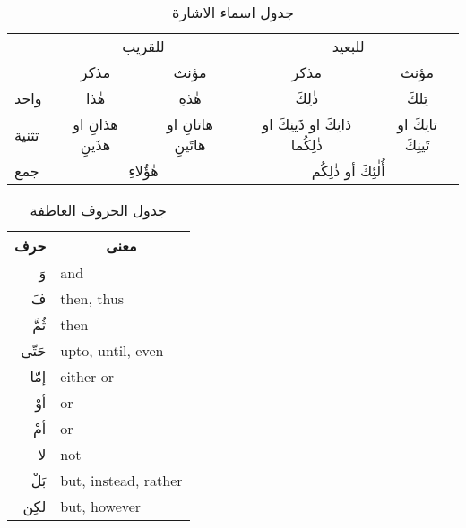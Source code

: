 \documentclass[../main.tex]{subfiles}
\begin{document}
\begin{table}[H]
\centering
\begin{tabular}{lcccc}
                           & \multicolumn{2}{c}{للقريب}                                                    & \multicolumn{2}{c}{للبعيد}                                                                  \\
                           & مذكر                                 & مؤنث                                   & مذكر                                               & مؤنث                                   \\ \cline{2-5} 
\multicolumn{1}{l|}{واحد}  & \multicolumn{1}{c|}{هٰذا}            & \multicolumn{1}{c|}{هٰذهِ}             & \multicolumn{1}{c|}{ذٰلِكَ}                        & \multicolumn{1}{c|}{تِلكَ}             \\ \cline{2-5} 
\multicolumn{1}{l|}{تثنية} & \multicolumn{1}{c|}{هذانِ او هذَينِ} & \multicolumn{1}{c|}{هاتانِ او هاتَينِ} & \multicolumn{1}{c|}{ذانِكَ او ذَينِكَ او ذٰلِكُما} & \multicolumn{1}{c|}{تانِكَ او تَينِكَ} \\ \cline{2-5} 
\multicolumn{1}{l|}{جمع}   & \multicolumn{2}{c|}{هٰؤُلاءِ}                                                 & \multicolumn{2}{c|}{أُلٰئِكَ أو ذٰلِكُم}                                                    \\ \cline{2-5} 
\end{tabular}
\caption{جدول اسماء الاشارة}
\label{table:ishara}
\end{table}

\begin{table}[H]
\centering
\begin{tabular}{|r|l|}
\hline
\multicolumn{1}{|c|}{حرف} & \multicolumn{1}{c|}{معنى} \\ \hline
وَ & \textenglish{and} \\ \hline
فَ & \textenglish{then, thus} \\ \hline
ثُمَّ & \textenglish{then} \\ \hline
حَتّى & \textenglish{upto, until, even} \\ \hline
إمّا & \textenglish{either or} \\ \hline
أوْ & \textenglish{or} \\ \hline
أمْ & \textenglish{or} \\ \hline
لا & \textenglish{not} \\ \hline
بَلْ & \textenglish{but, instead, rather} \\ \hline
لكِن & \textenglish{but, however} \\ \hline
\end{tabular}
\caption{جدول الحروف العاطفة}
\label{table:aatifah}
\end{table}
\end{document}
